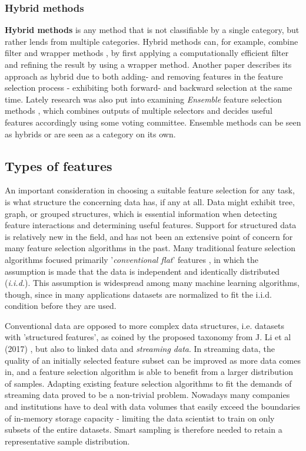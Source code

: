 \documentclass{article}
\begin{document}
\subsubsection{Hybrid methods}
\textbf{Hybrid methods} is any method that is not classifiable by a single category, but rather lends from multiple categories. Hybrid methods can, for example, combine filter and wrapper methods \citep{hsu_hybrid_2011}, by first applying a computationally efficient filter and refining the result by using a wrapper method. Another paper \citep{das_filters_2001} describes its approach as hybrid due to both adding- and removing features in the feature selection process - exhibiting both forward- and backward selection at the same time. Lately research was also put into examining \textit{Ensemble} feature selection methods \citep{bolon-canedo_ensembles_2019}, which combines outputs of multiple selectors and decides useful features accordingly using some voting committee. Ensemble methods can be seen as hybrids or are seen as a category on its own.

\subsection{Types of features}
An important consideration in choosing a suitable feature selection for any task, is what structure the concerning data has, if any at all. Data might exhibit tree, graph, or grouped structures, which is essential information when detecting feature interactions and determining useful features. Support for structured data is relatively new in the field, and has not been an extensive point of concern for many feature selection algorithms in the past. Many traditional feature selection algorithms focused primarily '\textit{conventional flat}' features \citep{li_feature_2017}, in which the assumption is made that the data is independent and identically distributed (\textit{i.i.d.}). This assumption is widespread among many machine learning algorithms, though, since in many applications datasets are normalized to fit the i.i.d. condition before they are used.

Conventional data are opposed to more complex data structures, i.e. datasets with 'structured features', as coined by the proposed taxonomy from J. Li et al (2017) \cite{li_feature_2017}, but also to linked data and \textit{streaming data}. In streaming data, the quality of an initially selected feature subset can be improved as more data comes in, and a feature selection algorithm is able to benefit from a larger distribution of samples. Adapting existing feature selection algorithms to fit the demands of streaming data proved to be a non-trivial problem. Nowadays many companies and institutions have to deal with data volumes that easily exceed the boundaries of in-memory storage capacity - limiting the data scientist to train on only subsets of the entire datasets. Smart sampling is therefore needed to retain a representative sample distribution.
\end{document}
